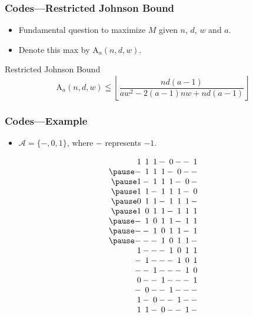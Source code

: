 \documentclass{beamer}
\newcommand{\A}{\mathcal{A}}
\newcommand{\M}{\mathrm{A}}
\begin{document}
\begin{frame}
 \frametitle{Codes---Restricted Johnson Bound}
 \begin{itemize}
  \item Fundamental question to maximize $M$ given $n$, $d$, $w$ and $a$.
  \item Denote this max by $\M_a(n,d,w)$.
 \end{itemize}
 \begin{block}{Restricted Johnson Bound}
 \begin{equation}\label{eq1}
  \M_a(n,d,w) \leqq \left\lfloor \frac{nd(a-1)}{aw^2-2(a-1)nw+nd(a-1)} \right\rfloor
 \end{equation}
 \end{block}
\end{frame}

\begin{frame}
 \frametitle{Codes---Example}
 \begin{itemize}
  \item $\A = \{-,0,1\}$, where $-$ represents $-1$.
 \end{itemize}
 \pause
 \begin{scriptsize}
 \[
 \arraycolsep=1.0pt\def\arraystretch{1.0}
 \begin{array}{rrrrrrrr}
1 & 1 & 1 & - & 0 & - & - & 1 \\ \pause
- & 1 & 1 & 1 & - & 0 & - & - \\ \pause
1 & - & 1 & 1 & 1 & - & 0 & - \\ \pause
1 & 1 & - & 1 & 1 & 1 & - & 0 \\ \pause
0 & 1 & 1 & - & 1 & 1 & 1 & - \\ \pause
1 & 0 & 1 & 1 & - & 1 & 1 & 1 \\ \pause
- & 1 & 0 & 1 & 1 & - & 1 & 1 \\ \pause 
- & - & 1 & 0 & 1 & 1 & - & 1 \\ \pause 
- & - & - & 1 & 0 & 1 & 1 & - \\
1 & - & - & - & 1 & 0 & 1 & 1 \\
- & 1 & - & - & - & 1 & 0 & 1 \\
- & - & 1 & - & - & - & 1 & 0 \\
0 & - & - & 1 & - & - & - & 1 \\
- & 0 & - & - & 1 & - & - & - \\
1 & - & 0 & - & - & 1 & - & - \\
1 & 1 & - & 0 & - & - & 1 & -
\end{array}
\]
\end{scriptsize}
\end{frame}
\end{document}
